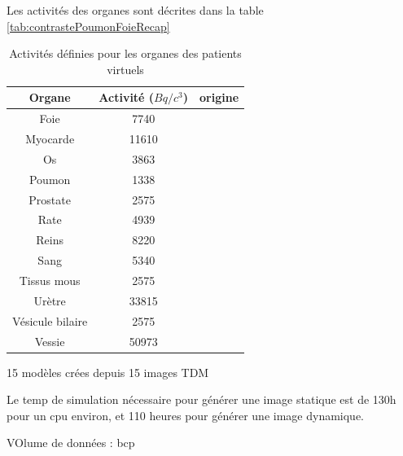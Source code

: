 Les activités des organes sont décrites dans la table \ref{tab:contrastePoumonFoieRecap}
\begin{table}
\centering
 \begin{tabular}{|c|c|c|} 
\hline
Organe 		& Activité ($Bq/c^3$) & origine\\
\hline
\hline
Foie		& 7740		      & \\
\hline
Myocarde	& 11610		      & \\
\hline
Os		& 3863		      & \\
\hline
Poumon 		& 1338 		      & \\
\hline
Prostate	& 2575		      & \\
\hline
Rate		& 4939		      & \\
\hline
Reins		& 8220		      & \\
\hline
Sang		& 5340		      & \\
\hline
Tissus mous 	& 2575 		      & \\
\hline
Urètre		& 33815		      & \\
\hline
Vésicule bilaire& 2575		      & \\
\hline
Vessie		& 50973		      & \\
\hline
 \end{tabular}

\caption[Activités des organes des patients de la base de donnée]{Activités définies pour les organes des patients virtuels}
\label{tab:activiteOrganes}
\end{table}

15 modèles crées depuis 15 images TDM

Le temp de simulation nécessaire pour générer une image statique est de 130h pour un cpu environ, et 110 heures pour générer une image dynamique.

VOlume de données : bcp
